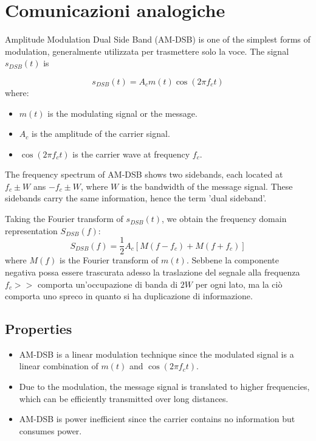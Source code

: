 \section*{Comunicazioni analogiche}

Amplitude Modulation Dual Side Band (AM-DSB) is one of the simplest forms of modulation, generalmente utilizzata per trasmettere solo la voce. The signal \( s_{DSB}(t) \) is 

\begin{equation}
s_{DSB}(t) = A_c m(t) \cos(2\pi f_c t)
\end{equation}
where:
\begin{itemize}
  \item \( m(t) \) is the modulating signal or the message.
  \item \( A_c \) is the amplitude of the carrier signal.
  \item \( \cos(2\pi f_c t) \) is the carrier wave at frequency \( f_c \).
\end{itemize}

The frequency spectrum of AM-DSB shows two sidebands, each located at \( f_c \pm W \) ans \( -f_c \pm W \), where \( W \) is the bandwidth of the message signal. These sidebands carry the same information, hence the term 'dual sideband'.

Taking the Fourier transform of \( s_{DSB}(t) \), we obtain the frequency domain representation \( S_{DSB}(f) \):
\begin{equation}
S_{DSB}(f) = \frac{1}{2} A_c [M(f - f_c) + M(f + f_c)]
\end{equation}
where \( M(f) \) is the Fourier transform of \( m(t) \).
Sebbene la componente negativa possa essere trascurata adesso la traslazione del segnale alla frequenza $f_c >> $ comporta un'occupazione di banda di $2W$ per ogni lato, ma la ciò comporta uno spreco in quanto si ha duplicazione di informazione. 
\subsection*{Properties}
\begin{itemize}
  \item AM-DSB is a linear modulation technique since the modulated signal is a linear combination of \( m(t) \) and \( \cos(2\pi f_c t) \).
  \item Due to the modulation, the message signal is translated to higher frequencies, which can be efficiently transmitted over long distances.
  \item AM-DSB is power inefficient since the carrier contains no information but consumes power.
\end{itemize}



